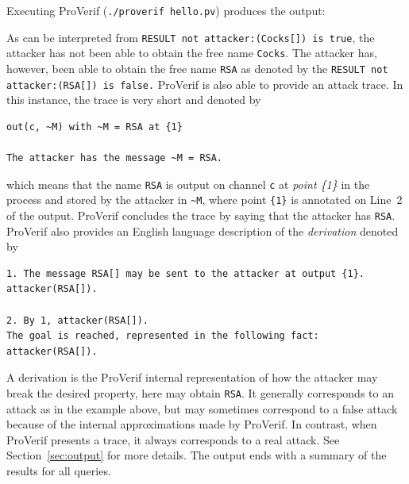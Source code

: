 \documentclass{book}
\begin{document}
Executing ProVerif (\texttt{./proverif {\docexdir}hello.pv}) produces the output:
%

%
As can be interpreted from \verb!RESULT not attacker:(Cocks[]) is true!, the attacker has not been able to obtain the free name \lstinline!Cocks!. The attacker has, however, been able to obtain the free name \lstinline!RSA! as denoted by the \verb!RESULT not attacker:(RSA[]) is false.! ProVerif is also able to provide an attack trace. In this instance, the trace is very short and denoted by
\begin{verbatim}
out(c, ~M) with ~M = RSA at {1}

The attacker has the message ~M = RSA.
\end{verbatim}
which means that the name \lstinline!RSA! is output on channel \lstinline!c! at \emph{point \{1\}} in the process and stored by the attacker in \verb!~M!, where point \lstinline!{1}! is annotated on Line~2 of the output. ProVerif concludes the trace by saying that the attacker has \lstinline!RSA!. ProVerif also provides an English language description of the \emph{derivation} denoted by
\begin{verbatim}
1. The message RSA[] may be sent to the attacker at output {1}.
attacker(RSA[]).

2. By 1, attacker(RSA[]).
The goal is reached, represented in the following fact:
attacker(RSA[]).
\end{verbatim}
A derivation is the ProVerif internal representation of how the attacker may break the desired property, here may obtain \lstinline!RSA!. It generally corresponds to an attack as in the example above, but may sometimes correspond to a false attack because of the internal approximations made by ProVerif. In contrast, when ProVerif presents a trace, it always corresponds to a real attack. See Section~\ref{sec:output} for more details.
The output ends with a summary of the results for all queries.
\end{document}
